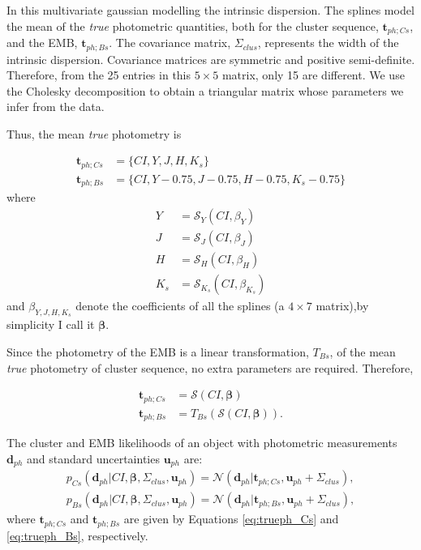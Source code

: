 In this multivariate gaussian modelling the intrinsic dispersion. The splines model the mean of the \emph{true} photometric quantities, both for the cluster sequence, $\boldsymbol{t}_{ph;Cs}$, and the EMB, $\boldsymbol{t}_{ph;Bs}$. The covariance matrix, $\Sigma_{clus}$, represents the width of the intrinsic dispersion. Covariance matrices are symmetric and positive semi-definite. Therefore, from the 25 entries in this $5\times 5$ matrix, only 15 are different. We use the Cholesky decomposition to obtain a triangular matrix whose  parameters we infer from the data.

 Thus, the mean \emph{true} photometry is

\begin{align}
\boldsymbol{t}_{ph;Cs}&= \{CI,Y,J,H,K_s\}\nonumber \\
\boldsymbol{t}_{ph;Bs}&=\{CI,Y-0.75,J-0.75,H-0.75,K_s-0.75\} \nonumber
\end{align}
where
\begin{align}
Y &=\mathcal{S}_Y(CI,\beta_Y) \nonumber \\
J &=\mathcal{S}_J(CI,\beta_J)\nonumber \\
 H &=\mathcal{S}_H(CI,\beta_H) \nonumber \\
 K_s &=\mathcal{S}_{K_s}(CI,\beta_{K_s})  \nonumber 
\end{align}
and $\beta_{Y,J,H,K_s}$ denote the coefficients of all the splines (a $4\times7$ matrix),by simplicity I call it $\boldsymbol{\beta}$.

Since the photometry of the EMB is a linear transformation, $T_{Bs}$, of the mean \emph{true} photometry of cluster sequence, no extra parameters are required. Therefore, 

\begin{align}
\boldsymbol{t}_{ph;Cs} &= \boldsymbol{\mathcal{S}}(CI, \boldsymbol{\beta}) \label{eq:trueph_Cs}\\
\boldsymbol{t}_{ph;Bs} &=T_{Bs}( \boldsymbol{\mathcal{S}}(CI, \boldsymbol{\beta})).
\label{eq:trueph_Bs}
\end{align}

The cluster and EMB likelihoods of an object with photometric measurements $\mathbf{d}_{ph}$ and standard uncertainties $\mathbf{u}_{ph}$ are:
\begin{align}
\label{eq:lik-seq}
 p_{Cs}(\mathbf{d}_{ph}| CI, \boldsymbol{\beta},\Sigma_{clus},\mathbf{u}_{ph})={\mathcal{N}}(\mathbf{d}_{ph}|\boldsymbol{t}_{ph;Cs}, \mathbf{u}_{ph}+\Sigma_{clus}),\nonumber \\
p_{Bs}(\mathbf{d}_{ph}| CI, \boldsymbol{\beta},\Sigma_{clus}, \mathbf{u}_{ph})={\mathcal{N}}(\mathbf{d}_{ph}|\boldsymbol{t}_{ph;Bs}, \mathbf{u}_{ph}+\Sigma_{clus}),
\end{align}
where $\boldsymbol{t}_{ph;Cs}$ and $\boldsymbol{t}_{ph;Bs}$ are given by Equations \ref{eq:trueph_Cs} and \ref{eq:trueph_Bs}, respectively.

